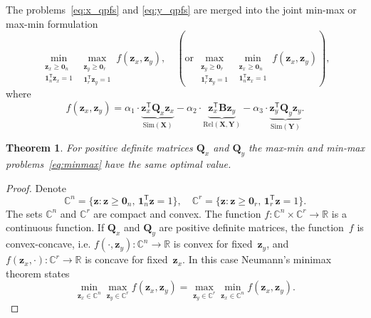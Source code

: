 \documentclass[12pt,twoside]{article}
\newtheorem{theorem}{Theorem}
\theoremstyle{definition}
\newcommand{\bz}{\mathbf{z}}
\newcommand{\bY}{\mathbf{Y}}
\newcommand{\bX}{\mathbf{X}}
\newcommand{\bB}{\mathbf{B}}
\newcommand{\bQ}{\mathbf{Q}}
\newcommand{\bbR}{\mathbb{R}}
\newcommand{\T}{\mathsf{T}}
\newcommand{\bOne}{\boldsymbol{1}}
\newcommand{\bZero}{\boldsymbol{0}}
\begin{document}
The problems~\eqref{eq:x_qpfs} and \eqref{eq:y_qpfs} are merged into the joint min-max or max-min formulation
\begin{equation}
	\min_{\substack{\bz_x \geq \bZero_n \\ \bOne_n^{\T}\bz_x=1}} 	\max_{\substack{\bz_y \geq \bZero_r \\ \bOne_r^{\T}\bz_y=1}} f(\bz_x, \bz_y), \quad \left(\text {or} \, \max_{\substack{\bz_y \geq \bZero_r \\ \bOne_r^{\T}\bz_y=1}} \min_{\substack{\bz_x \geq \bZero_n \\ \bOne_n^{\T}\bz_x=1}} f(\bz_x, \bz_y)\right),
	\label{eq:minmax}
\end{equation}
where
\[
	f(\bz_x, \bz_y) = \alpha_1 \cdot \underbrace{\bz_x^{\T} \bQ_x \bz_x}_{\text{Sim}(\bX)} - \alpha_2 \cdot \underbrace{\bz_x^{\T} \bB \bz_y}_{\text{Rel}(\bX, \bY)} - \alpha_3 \cdot \underbrace{\bz_y^{\T} \bQ_y \bz_y}_{\text{Sim}(\bY)}.
\]
\begin{theorem}
	For positive definite matrices $\bQ_x$ and $\bQ_y$ the max-min and min-max problems~\eqref{eq:minmax} have the same optimal value.
\end{theorem}
\begin{proof}
	Denote
	\begin{equation*}
	\mathbb{C}^n = \{\bz : \bz \geq \bZero_n, \, \bOne_n^{\T}\bz=1\}, \quad \mathbb{C}^r = \{\bz : \bz \geq \bZero_r, \, \bOne_r^{\T}\bz=1\}.
	\end{equation*}
	The sets $\mathbb{C}^n$ and $\mathbb{C}^r$ are compact and convex. The function $f: \mathbb{C}^n \times \mathbb{C}^r \rightarrow \bbR$ is a continuous function. If $\bQ_x$ and $\bQ_y$ are positive definite matrices, the function~$f$ is convex-concave, i.e.
	$f(\cdot, \bz_y): \mathbb{C}^n \rightarrow \bbR$ is convex for fixed~$\bz_y$, and $f(\bz_x, \cdot): \mathbb{C}^r \rightarrow \bbR$ is concave for fixed~$\bz_x$.
	In this case Neumann's minimax theorem states
	\[
	\min_{\bz_x \in \mathbb{C}^n} \max_{\bz_y \in \mathbb{C}^r} f(\bz_x, \bz_y) = \max_{\bz_y \in \mathbb{C}^r} \min_{\bz_x\in \mathbb{C}^n} f(\bz_x, \bz_y).
	\]
\end{proof}
\end{document}
